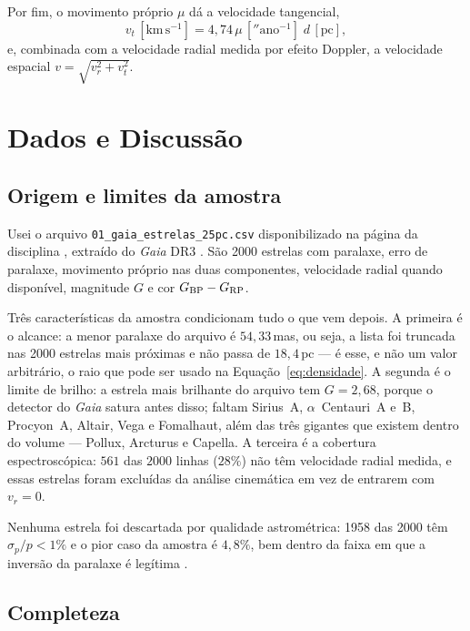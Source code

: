 \documentclass[10pt,a4paper,twocolumn]{article}
\begin{document}
Por fim, o movimento próprio $\mu$ dá a velocidade tangencial,
\begin{equation}
    v_t\,[\mathrm{km\,s^{-1}}]=4{,}74\,\mu\,['' \mathrm{ano^{-1}}]\;
    d\,[\mathrm{pc}] ,
    \label{eq:vt}
\end{equation}
e, combinada com a velocidade radial medida por efeito Doppler, a
velocidade espacial $v=\sqrt{v_r^2+v_t^2}$.

\section{Dados e Discussão}
\label{sec:dados}

\subsection{Origem e limites da amostra}

Usei o arquivo \texttt{01\_gaia\_estrelas\_25pc.csv} disponibilizado na
página da disciplina \cite{apostila}, extraído do \textit{Gaia} DR3
\cite{gaia}. São 2000 estrelas com paralaxe, erro de paralaxe, movimento
próprio nas duas componentes, velocidade radial quando disponível,
magnitude $G$ e cor $G_{\rm BP}-G_{\rm RP}$.

Três características da amostra condicionam tudo o que vem depois. A
primeira é o alcance: a menor paralaxe do arquivo é $54{,}33\,$mas, ou
seja, a lista foi truncada nas 2000 estrelas mais próximas e não passa de
$18{,}4\,\mathrm{pc}$ --- é esse, e não um valor arbitrário, o raio que
pode ser usado na Equação~\eqref{eq:densidade}. A segunda é o limite de
brilho: a estrela mais brilhante do arquivo tem $G=2{,}68$, porque o
detector do \textit{Gaia} satura antes disso; faltam Sirius~A,
$\alpha$~Centauri~A e~B, Procyon~A, Altair, Vega e Fomalhaut, além das
três gigantes que existem dentro do volume --- Pollux, Arcturus e Capella.
A terceira é a cobertura espectroscópica: $561$ das $2000$ linhas
($28\%$) não têm velocidade radial medida, e essas estrelas foram
excluídas da análise cinemática em vez de entrarem com $v_r=0$.

Nenhuma estrela foi descartada por qualidade astrométrica: 1958 das 2000
têm $\sigma_p/p<1\%$ e o pior caso da amostra é $4{,}8\%$, bem dentro da
faixa em que a inversão da paralaxe é legítima \cite{luri}.

\subsection{Completeza}
\end{document}

